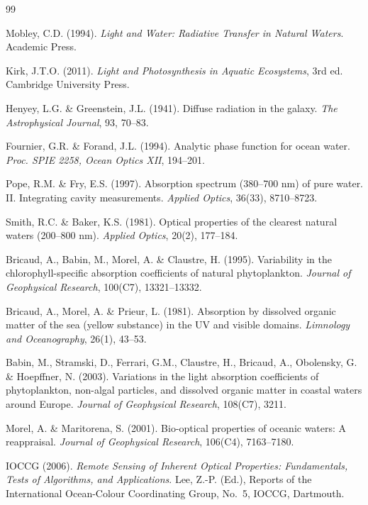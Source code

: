 \documentclass[11pt,a4paper]{article}
\begin{document}
\begin{thebibliography}{99}

 Mobley, C.D. (1994). \emph{Light and Water: Radiative Transfer in
Natural Waters}. Academic Press.

 Kirk, J.T.O. (2011). \emph{Light and Photosynthesis in Aquatic
Ecosystems}, 3rd ed. Cambridge University Press.

 Henyey, L.G. \& Greenstein, J.L. (1941). Diffuse radiation in the
galaxy. \emph{The Astrophysical Journal}, 93, 70--83.

 Fournier, G.R. \& Forand, J.L. (1994). Analytic phase function
for ocean water. \emph{Proc. SPIE 2258, Ocean Optics XII}, 194--201.

 Pope, R.M. \& Fry, E.S. (1997). Absorption spectrum (380--700 nm)
of pure water. II. Integrating cavity measurements. \emph{Applied Optics}, 36(33),
8710--8723.

 Smith, R.C. \& Baker, K.S. (1981). Optical properties of the
clearest natural waters (200--800 nm). \emph{Applied Optics}, 20(2), 177--184.

 Bricaud, A., Babin, M., Morel, A. \& Claustre, H. (1995).
Variability in the chlorophyll-specific absorption coefficients of natural
phytoplankton. \emph{Journal of Geophysical Research}, 100(C7), 13321--13332.

 Bricaud, A., Morel, A. \& Prieur, L. (1981). Absorption by
dissolved organic matter of the sea (yellow substance) in the UV and visible
domains. \emph{Limnology and Oceanography}, 26(1), 43--53.

 Babin, M., Stramski, D., Ferrari, G.M., Claustre, H., Bricaud, A.,
Obolensky, G. \& Hoepffner, N. (2003). Variations in the light absorption
coefficients of phytoplankton, non-algal particles, and dissolved organic matter in
coastal waters around Europe. \emph{Journal of Geophysical Research}, 108(C7), 3211.

 Morel, A. \& Maritorena, S. (2001). Bio-optical properties of
oceanic waters: A reappraisal. \emph{Journal of Geophysical Research}, 106(C4),
7163--7180.

 IOCCG (2006). \emph{Remote Sensing of Inherent Optical Properties:
Fundamentals, Tests of Algorithms, and Applications}. Lee, Z.-P. (Ed.), Reports of
the International Ocean-Colour Coordinating Group, No.~5, IOCCG, Dartmouth.


\end{thebibliography}
\end{document}
